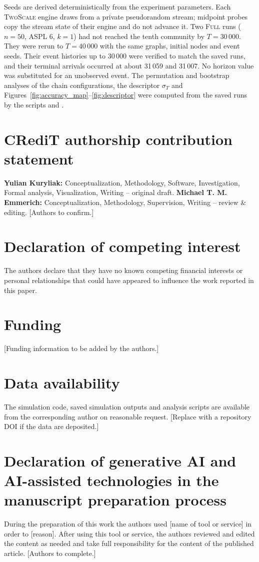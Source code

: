 \documentclass[a4paper,fleqn]{cas-sc}
\newcommand{\Full}{\textup{\textsc{Full}}}
\newcommand{\TS}{\textup{\textsc{TwoScale}}}
\begin{document}
Seeds are derived deterministically from the experiment parameters. Each \TS{} engine draws from a private pseudorandom stream; midpoint probes copy the stream state of their engine and do not advance it. Two \Full{} runs ($n=50$, ASPL 6, $k=1$) had not reached the tenth community by $T=30\,000$. They were rerun to $T=40\,000$ with the same graphs, initial nodes and event seeds. Their event histories up to 30\,000 were verified to match the saved runs, and their terminal arrivals occurred at about 31\,059 and 31\,007. No horizon value was substituted for an unobserved event. The permutation and bootstrap analyses of the chain configurations, the descriptor $\sigma_T$ and Figures~\ref{fig:accuracy_map}--\ref{fig:descriptor} were computed from the saved runs by the scripts  and .

\section*{CRediT authorship contribution statement}
\textbf{Yulian Kuryliak:} Conceptualization, Methodology, Software, Investigation, Formal analysis, Visualization, Writing -- original draft. \textbf{Michael T. M. Emmerich:} Conceptualization, Methodology, Supervision, Writing -- review \& editing. [Authors to confirm.]

\section*{Declaration of competing interest}
The authors declare that they have no known competing financial interests or personal relationships that could have appeared to influence the work reported in this paper.

\section*{Funding}
[Funding information to be added by the authors.]

\section*{Data availability}
The simulation code, saved simulation outputs and analysis scripts are available from the corresponding author on reasonable request. [Replace with a repository DOI if the data are deposited.]

\section*{Declaration of generative AI and AI-assisted technologies in the manuscript preparation process}
During the preparation of this work the authors used [name of tool or service] in order to [reason]. After using this tool or service, the authors reviewed and edited the content as needed and take full responsibility for the content of the published article. [Authors to complete.]



\end{document}
